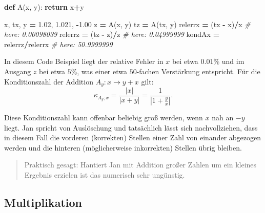 \documentclass[
]{book}
\newenvironment{Shaded}{\begin{snugshade}}{\end{snugshade}}
\newcommand{\CommentTok}[1]{\textcolor[rgb]{0.56,0.35,0.01}{\textit{#1}}}
\newcommand{\ControlFlowTok}[1]{\textcolor[rgb]{0.13,0.29,0.53}{\textbf{#1}}}
\newcommand{\FloatTok}[1]{\textcolor[rgb]{0.00,0.00,0.81}{#1}}
\newcommand{\KeywordTok}[1]{\textcolor[rgb]{0.13,0.29,0.53}{\textbf{#1}}}
\newcommand{\NormalTok}[1]{#1}
\newcommand{\OperatorTok}[1]{\textcolor[rgb]{0.81,0.36,0.00}{\textbf{#1}}}
\newenvironment {JHSAYS} [0] {\begin{quote}\color{jhsc}} {\end{quote}}
\theoremstyle{definition}
\theoremstyle{definition}
\theoremstyle{definition}
\theoremstyle{definition}
\theoremstyle{remark}
\begin{document}
\begin{Shaded}
\begin{Highlighting}[]
\KeywordTok{def}\NormalTok{ A(x, y):}
    \ControlFlowTok{return}\NormalTok{ x}\OperatorTok{+}\NormalTok{y}

\NormalTok{x, tx, y }\OperatorTok{=} \FloatTok{1.02}\NormalTok{, }\FloatTok{1.021}\NormalTok{, }\OperatorTok{{-}}\FloatTok{1.00}
\NormalTok{z }\OperatorTok{=}\NormalTok{ A(x, y)}
\NormalTok{tz }\OperatorTok{=}\NormalTok{ A(tx, y)}
\NormalTok{relerrx }\OperatorTok{=}\NormalTok{ (tx }\OperatorTok{{-}}\NormalTok{ x)}\OperatorTok{/}\NormalTok{x        }\CommentTok{\# here: 0.00098039}
\NormalTok{relerrz }\OperatorTok{=}\NormalTok{ (tz }\OperatorTok{{-}}\NormalTok{ z)}\OperatorTok{/}\NormalTok{z        }\CommentTok{\# here: 0.04999999}
\NormalTok{kondAx }\OperatorTok{=}\NormalTok{ relerrz}\OperatorTok{/}\NormalTok{relerrx    }\CommentTok{\# here: 50.9999999}
\end{Highlighting}
\end{Shaded}

In diesem Code Beispiel liegt der relative Fehler in \(x\) bei etwa \(0.01\)\% und im Ausgang \(z\) bei etwa \(5\)\%, was einer etwa \(50\)-fachen Verstärkung entspricht.
Für die Konditionszahl der Addition \(A_y\colon x \to y+x\) gilt:
\begin{equation*}
\kappa_{A_y;x} = \frac{|x|}{|x+y|} = \frac{1}{|1+\frac{y}{x}|}.
\end{equation*}

Diese Konditionszahl kann offenbar beliebig groß werden, wenn \(x\) nah an \(-y\) liegt. Jan spricht von Auslöschung und tatsächlich lässt sich nachvollziehen, dass in diesem Fall die vorderen (korrekten) Stellen einer Zahl von einander abgezogen werden und die hinteren (möglicherweise inkorrekten) Stellen übrig bleiben.

\leavevmode\hypertarget{rem-kons-addition}{}%
\begin{JHSAYS}
Praktisch gesagt: Hantiert Jan mit Addition großer Zahlen um ein kleines Ergebnis erzielen ist das numerisch sehr ungünstig.

\end{JHSAYS}

\hypertarget{multiplikation}{%
\subsection{Multiplikation}\label{multiplikation}}
\end{document}
